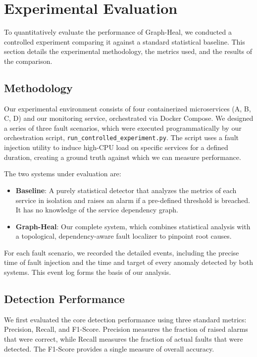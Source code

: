 \documentclass[11pt,conference]{IEEEtran}
\begin{document}
\section{Experimental Evaluation}
\label{sec:evaluation}

To quantitatively evaluate the performance of Graph-Heal, we conducted a controlled experiment comparing it against a standard statistical baseline. This section details the experimental methodology, the metrics used, and the results of the comparison.

\subsection{Methodology}
Our experimental environment consists of four containerized microservices (A, B, C, D) and our monitoring service, orchestrated via Docker Compose. We designed a series of three fault scenarios, which were executed programmatically by our orchestration script, \texttt{run\_controlled\_experiment.py}. The script uses a fault injection utility to induce high-CPU load on specific services for a defined duration, creating a ground truth against which we can measure performance.

The two systems under evaluation are:
\begin{itemize}
    \item \textbf{Baseline}: A purely statistical detector that analyzes the metrics of each service in isolation and raises an alarm if a pre-defined threshold is breached. It has no knowledge of the service dependency graph.
    \item \textbf{Graph-Heal}: Our complete system, which combines statistical analysis with a topological, dependency-aware fault localizer to pinpoint root causes.
\end{itemize}

For each fault scenario, we recorded the detailed events, including the precise time of fault injection and the time and target of every anomaly detected by both systems. This event log forms the basis of our analysis.

\subsection{Detection Performance}
We first evaluated the core detection performance using three standard metrics: Precision, Recall, and F1-Score. Precision measures the fraction of raised alarms that were correct, while Recall measures the fraction of actual faults that were detected. The F1-Score provides a single measure of overall accuracy.
\end{document}
